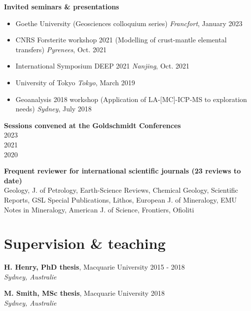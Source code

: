\documentclass[a4paper,11pt]{article}
\begin{document}
    \textbf{Invited seminars \& presentations}
    \begin{itemize}[label={},itemsep=0pt,parsep=0pt]
        \item Goethe University (Geosciences colloquium series)
            \hfill \textit{Francfort}, {January 2023}
        \item CNRS Forsterite workshop 2021 (Modelling of crust-mantle elemental transfers)
            \hfill \textit{Pyrenees}, {Oct. 2021}
        \item International Symposium DEEP 2021
            \hfill \textit{Nanjing}, {Oct. 2021}
        \item University of Tokyo
            \hfill \textit{Tokyo}, {March 2019}
        \item Geoanalysis 2018 workshop (Application of LA-[MC]-ICP-MS to exploration needs)
            \hfill \textit{Sydney}, {July 2018}
    \end{itemize}

    \textbf{Sessions convened at the Goldschmidt Conferences}\\
     \hfill {2023}\\
     \hfill {2021} \\
     \hfill {2020}
    
    \textbf{Frequent reviewer for international scientific journals (23 reviews to date)}\\
      Geology, J. of Petrology, Earth-Science Reviews, Chemical Geology, Scientific Reports, GSL Special Publications, Lithos, European J. of Mineralogy, EMU Notes in Mineralogy, American J. of Science, Frontiers, Ofioliti

\section{Supervision \& teaching}
    \textbf{H. Henry, PhD thesis}, Macquarie University
    \hfill {2015 - 2018}\\ 
    \hfill \textit{Sydney, Australie}

    \textbf{M. Smith, MSc thesis}, Macquarie University
    \hfill {2018}\\ 
    \hfill \textit{Sydney, Australie}
\end{document}
